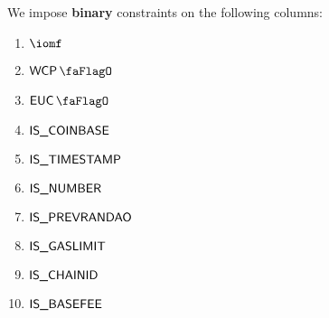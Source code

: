 We impose \textbf{binary} constraints on the following columns:
\begin{multicols}{4}
	\begin{enumerate}
		\item $\iomf$
		\item $\wcpFlag$
		\item $\eucFlag$
		\item $\textsf{IS\_COINBASE}$
		\item $\textsf{IS\_TIMESTAMP}$
		\item $\textsf{IS\_NUMBER}$
		\item $\textsf{IS\_PREVRANDAO}$
		\item $\textsf{IS\_GASLIMIT}$
		\item $\textsf{IS\_CHAINID}$
		\item $\textsf{IS\_BASEFEE}$
	\end{enumerate}
\end{multicols}
